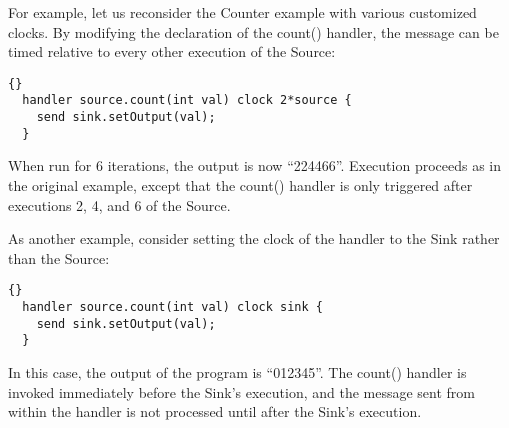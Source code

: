 For example, let us reconsider the Counter example with various
customized clocks.  By modifying the declaration of the count()
handler, the message can be timed relative to every other execution of
the Source:

\begin{lstlisting}{}
  handler source.count(int val) clock 2*source {
    send sink.setOutput(val);
  }
\end{lstlisting}{}

When run for 6 iterations, the output is now ``224466''.  Execution
proceeds as in the original example, except that the count() handler
is only triggered after executions 2, 4, and 6 of the Source.

As another example, consider setting the clock of the handler to the
Sink rather than the Source:

\begin{lstlisting}{}
  handler source.count(int val) clock sink {
    send sink.setOutput(val);
  }
\end{lstlisting}{}

In this case, the output of the program is ``012345''.  The count()
handler is invoked immediately before the Sink's execution, and the
message sent from within the handler is not processed until after the
Sink's execution.

\medskip
{}

\medskip
{}








